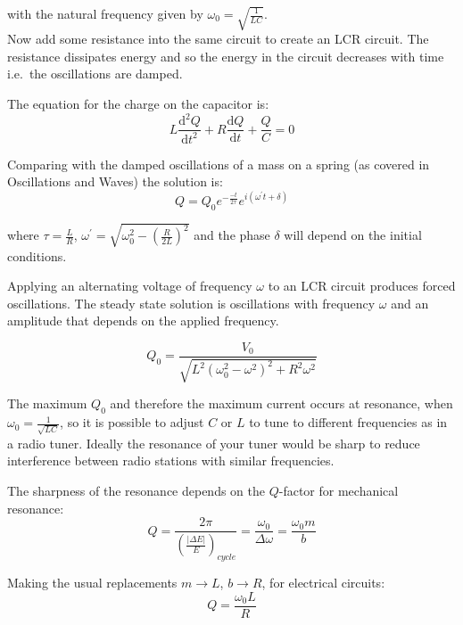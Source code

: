 \documentclass[
]{book}
\numberwithin{equation}{section}
\begin{document}
with the natural frequency given by \(\omega_0 = \sqrt{ \frac{1}{LC} }\).\\
Now add some resistance into the same circuit to create an LCR circuit.
The resistance dissipates energy and so the energy in the circuit
decreases with time i.e.~the oscillations are damped.

The equation for the charge on the capacitor is:
\begin{equation}
\label{eq:diffEqQ}
L \frac{ \mathrm{d}^2 Q}{\mathrm{d} t^2} + R \frac{\mathrm{d} Q}{\mathrm{d} t} + \frac{Q}{C} = 0
\end{equation}

Comparing with the damped oscillations of a mass on a spring (as covered
in Oscillations and Waves) the solution is:
\begin{equation}
\label{eq:Qsol}
Q = Q_0 e^{ - \frac{-t}{2\tau} } e^{i(\omega^{'} t + \delta)}
\end{equation}

where \(\tau = \frac{L}{R}\),
\(\omega^{'} = \sqrt{ \omega_0^2 - \left( \frac{R}{2 L} \right)^2}\) and
the phase \(\delta\) will depend on the initial conditions.

Applying an alternating voltage of frequency \(\omega\) to an LCR circuit
produces forced oscillations. The steady state solution is oscillations
with frequency \(\omega\) and an amplitude that depends on the applied
frequency.

\begin{equation}
\label{eq:Q0}
Q_0 = \frac{V_0}{\sqrt{ L^2 (\omega_0^2 - \omega^2)^2 + R^2 \omega^2 }}
\end{equation}

The maximum \(Q_0\) and therefore the maximum current occurs at resonance,
when \(\omega_0 = \frac{1}{\sqrt{LC}}\), so it is possible to adjust \(C\)
or \(L\) to tune to different frequencies as in a radio tuner. Ideally the
resonance of your tuner would be sharp to reduce interference between
radio stations with similar frequencies.

The sharpness of the resonance depends on the \(Q\)-factor for mechanical
resonance:
\begin{equation}
\label{eq:Qfactor}
Q = \frac{2\pi}{ \left( \frac{|\Delta E|}{E} \right)_{cycle} } = \frac{\omega_0}{\Delta \omega} = \frac{\omega_0 m}{b}
\end{equation}

Making the usual replacements \(m \rightarrow L\), \(b \rightarrow R\), for
electrical circuits:
\begin{equation}
\label{eq:QvsOmega}
Q = \frac{\omega_0 L}{R}
\end{equation}
\end{document}
